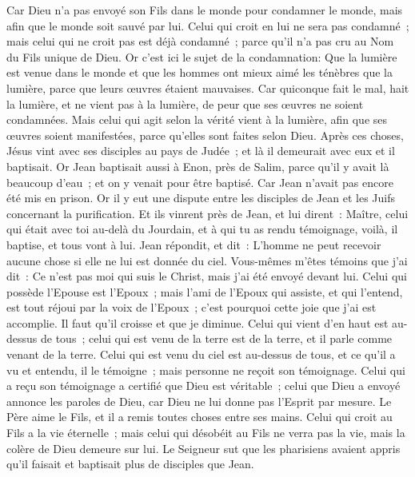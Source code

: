 \begin{multicols}{2}
Car Dieu n'a pas envoyé son Fils dans le monde pour condamner le monde, mais afin que le monde soit sauvé par lui.
Celui qui croit en lui ne sera pas condamné~; mais celui qui ne croit pas est déjà condamné~; parce qu'il n'a pas cru au Nom du Fils unique de Dieu.
Or c'est ici le sujet de la condamnation: Que la lumière est venue dans le monde et que les hommes ont mieux aimé les ténèbres que la lumière, parce que leurs œuvres étaient mauvaises.
Car quiconque fait le mal, hait la lumière, et ne vient pas à la lumière, de peur que ses œuvres ne soient condamnées.
Mais celui qui agit selon la vérité vient à la lumière, afin que ses œuvres soient manifestées, parce qu'elles sont faites selon Dieu.
Après ces choses, Jésus vint avec ses disciples au pays de Judée~; et là il demeurait avec eux et il baptisait.
Or Jean baptisait aussi à Enon, près de Salim, parce qu'il y avait là beaucoup d'eau~; et on y venait pour être baptisé.
Car Jean n'avait pas encore été mis en prison.
Or il y eut une dispute entre les disciples de Jean et les Juifs concernant la purification.
Et ils vinrent près de Jean, et lui dirent~: Maître, celui qui était avec toi au-delà du Jourdain, et à qui tu as rendu témoignage, voilà, il baptise, et tous vont à lui.
Jean répondit, et dit~: L'homme ne peut recevoir aucune chose si elle ne lui est donnée du ciel.
Vous-mêmes m'êtes témoins que j'ai dit~: Ce n'est pas moi qui suis le Christ, mais j'ai été envoyé devant lui.
Celui qui possède l'Epouse est l'Epoux~; mais l'ami de l'Epoux qui assiste, et qui l'entend, est tout réjoui par la voix de l'Epoux~; c'est pourquoi cette joie que j'ai est accomplie.
Il faut qu'il croisse et que je diminue.
Celui qui vient d'en haut est au-dessus de tous~; celui qui est venu de la terre est de la terre, et il parle comme venant de la terre. Celui qui est venu du ciel est au-dessus de tous,
et ce qu'il a vu et entendu, il le témoigne~; mais personne ne reçoit son témoignage.
Celui qui a reçu son témoignage a certifié que Dieu est véritable~;
celui que Dieu a envoyé annonce les paroles de Dieu, car Dieu ne lui donne pas l'Esprit par mesure.
Le Père aime le Fils, et il a remis toutes choses entre ses mains.
Celui qui croit au Fils a la vie éternelle~; mais celui qui désobéit au Fils ne verra pas la vie, mais la colère de Dieu demeure sur lui.
\VerseOne{}Le Seigneur sut que les pharisiens avaient appris qu'il faisait et baptisait plus de disciples que Jean.

\end{multicols}
